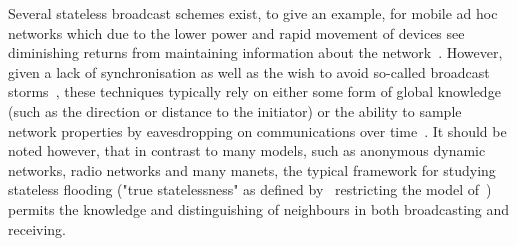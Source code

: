 Several stateless broadcast schemes exist, to give an example, for mobile ad hoc networks which due to the lower power and rapid movement of devices see diminishing returns from maintaining information about the network~\cite{manfredi2011understanding}. 
However, given a lack of synchronisation as well as the wish to avoid so-called broadcast storms~\cite{ni1999broadcast}, these techniques typically rely on either some form of global knowledge (such as the direction or distance to the initiator) or the ability to sample network properties by eavesdropping on communications over time~\cite{manetsArentReallyStateless,ruiz2015survey}.
It should be noted however, that in contrast to many models, such as anonymous dynamic networks, radio networks and many manets, the typical framework for studying stateless flooding ("true statelessness" as defined by~\cite{turau2020stateless} restricting the model of~\cite{dolev2017stateless}) permits the knowledge and distinguishing of neighbours in both broadcasting and receiving.


